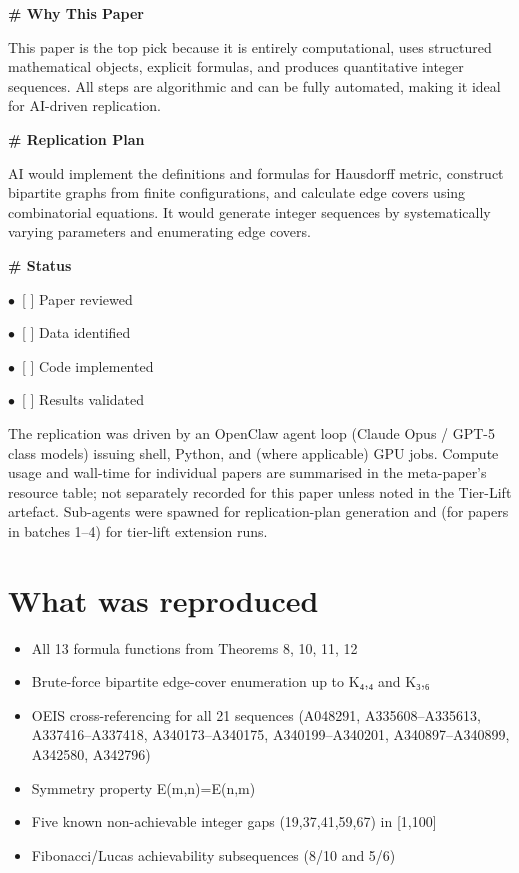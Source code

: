 \documentclass[11pt]{article}
\begin{document}
\par\medskip\textbf{\# Why This Paper}\par
This paper is the top pick because it is entirely computational, uses structured mathematical objects, explicit formulas, and produces quantitative integer sequences. All steps are algorithmic and can be fully automated, making it ideal for AI-driven replication.

\par\medskip\textbf{\# Replication Plan}\par
AI would implement the definitions and formulas for Hausdorff metric, construct bipartite graphs from finite configurations, and calculate edge covers using combinatorial equations. It would generate integer sequences by systematically varying parameters and enumerating edge covers.

\par\medskip\textbf{\# Status}\par
\par$\bullet$\ [ ] Paper reviewed
\par$\bullet$\ [ ] Data identified
\par$\bullet$\ [ ] Code implemented
\par$\bullet$\ [ ] Results validated
\normalsize

The replication was driven by an OpenClaw agent loop (Claude Opus / GPT-5 class models) issuing shell, Python, and (where applicable) GPU jobs. Compute usage and wall-time for individual papers are summarised in the meta-paper's resource table; not separately recorded for this paper unless noted in the Tier-Lift artefact. Sub-agents were spawned for replication-plan generation and (for papers in batches 1--4) for tier-lift extension runs.

\section{What was reproduced}
\begin{itemize}
\item All 13 formula functions from Theorems 8, 10, 11, 12
\item Brute-force bipartite edge-cover enumeration up to K₄,₄ and K₃,₆
\item OEIS cross-referencing for all 21 sequences (A048291, A335608–A335613, A337416–A337418, A340173–A340175, A340199–A340201, A340897–A340899, A342580, A342796)
\item Symmetry property E(m,n)=E(n,m)
\item Five known non-achievable integer gaps (19,37,41,59,67) in [1,100]
\item Fibonacci/Lucas achievability subsequences (8/10 and 5/6)
\end{itemize}
\end{document}
